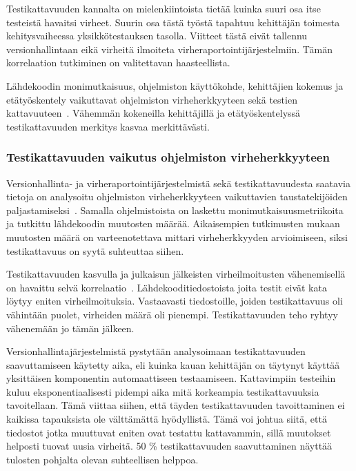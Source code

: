 \documentclass[finnish]{../tktltiki2}
\theoremstyle{definition}
\theoremstyle{remark}
\begin{document}
    Testikattavuuden kannalta on mielenkiintoista tietää kuinka suuri osa itse testeistä havaitsi virheet. Suurin osa 
tästä työstä tapahtuu kehittäjän toimesta kehitysvaiheessa yksikkötestauksen tasolla. Viitteet tästä eivät tallennu 
versionhallintaan eikä virheitä ilmoiteta virheraportointijärjestelmiin. Tämän korrelaation tutkiminen on valitettavan 
haasteellista.

    Lähdekoodin monimutkaisuus, ohjelmiston käyttökohde, kehittäjien kokemus ja etätyöskentely vaikuttavat ohjelmiston 
virheherkkyyteen sekä testien kattavuuteen~\cite{MNDT09}. Vähemmän kokeneilla kehittäjillä ja etätyöskentelyssä 
testikattavuuden merkitys kasvaa merkittävästi. 

\subsubsection{Testikattavuuden vaikutus ohjelmiston virheherkkyyteen}

Versionhallinta- ja virheraportointijärjestelmistä sekä testikattavuudesta saatavia tietoja on analysoitu ohjelmiston 
virheherkkyyteen vaikuttavien taustatekijöiden paljastamiseksi~\cite{MNDT09}. Samalla ohjelmistoista on laskettu 
monimutkaisuusmetriikoita ja tutkittu lähdekoodin muutosten määrää. Aikaisempien tutkimusten mukaan muutosten määrä on 
varteenotettava mittari virheherkkyyden arvioimiseen, siksi testikattavuus on syytä suhteuttaa siihen.

    Testikattavuuden kasvulla ja julkaisun jälkeisten virheilmoitusten vähenemisellä on havaittu selvä 
korrelaatio~\cite{MNDT09}. Lähdekooditiedostoista joita testit eivät kata löytyy eniten virheilmoituksia. Vastaavasti 
tiedostoille, joiden testikattavuus oli vähintään puolet, virheiden määrä oli pienempi. Testikattavuuden teho ryhtyy 
vähenemään jo tämän jälkeen.

    Versionhallintajärjestelmistä pystytään analysoimaan testikattavuuden saavuttamiseen käytetty aika, eli kuinka kauan 
kehittäjän on täytynyt käyttää yksittäisen komponentin automaattiseen testaamiseen. Kattavimpiin testeihin kuluu 
eksponentiaalisesti pidempi aika mitä korkeampia testikattavuuksia tavoitellaan. Tämä viittaa siihen, että täyden 
testikattavuuden tavoittaminen ei kaikissa tapauksista ole välttämättä hyödyllistä. Tämä voi johtua siitä, että 
tiedostot jotka muuttuvat eniten ovat testattu kattavammin, sillä muutokset helposti tuovat uusia virheitä. 50 \% 
testikattavuuden saavuttaminen näyttää tulosten pohjalta olevan suhteellisen helppoa.
\end{document}
